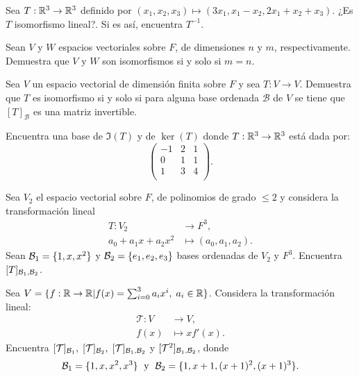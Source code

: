 \documentclass[12pt,a4paper]{book}
\newcommand{\llaves}[1]{\{#1\}}
\begin{document}
    \begin{ejercicio}
        Sea $T: \mathbb{R}^3 \to \mathbb{R}^3$ definido por $(x_1, x_2, x_3) \mapsto (3x_1, x_1 - x_2, 2x_1 + x_2 + x_3)$. ¿Es $T$ isomorfismo lineal?. Si es así, encuentra $T^{-1}$.
    \end{ejercicio}

    \begin{ejercicio}
        Sean $V$ y $W$ espacios vectoriales sobre $F$, de dimensiones $n$ y $m$, respectivamente. Demuestra que $V$ y $W$ son isomorfismos si y solo si $m = n$.
    \end{ejercicio}

    \begin{ejercicio}
        Sea $V$ un espacio vectorial de dimensión finita sobre $F$ y sea $T: V \to V$. Demuestra que $T$ es isomorfismo si y solo si para alguna base ordenada $\mathcal{B}$ de $V$ se tiene que $[T]_\mathcal{B}$ es una matriz invertible.
    \end{ejercicio}

    \begin{ejercicio}
        Encuentra una base de $\Im (T)$ y de $\ker (T)$ donde $T: \mathbb{R}^3 \to \mathbb{R}^3$ está dada por:
        \[
        \begin{pmatrix}
            -1 & 2 & 1\\
            0 & 1 & 1\\
            1 & 3 & 4\\
        \end{pmatrix}.
        \]
    \end{ejercicio}

    \begin{ejercicio}
        Sea $V_2$ el espacio vectorial sobre $F$, de polinomios de grado $\leq 2$ y considera la transformación lineal
        \begin{align*}
            T : V_2 & \to F^3,\\
            a_0 + a_1x + a_2x^2 & \mapsto (a_0, a_1, a_2).
        \end{align*}
        Sean $\BB_1 = \llaves{1, x, x^2}$ y $\BB_2 = \llaves{e_1, e_2, e_3}$ bases ordenadas de $V_2$ y $F^3$. Encuentra $[T]_{\mathcal{B}_1, \mathcal{B}_2}$.
    \end{ejercicio}

    \begin{ejercicio}
        Sea $V = \llaves{f: \R \to \R | f(x) = \sum_{i = 0}^{3}a_ix^{i},\; a_i \in \R}$. Considera la transformación lineal:
        \begin{align*}
            \mathcal{T}: V & \to V,\\
            f(x) & \mapsto xf'(x).
        \end{align*}
        Encuentra $[\mathcal{T}]_{\mathcal{B}_1}, \; [\mathcal{T}]_{\mathcal{B}_2}, \; [\mathcal{T}]_{\mathcal{B}_1, \mathcal{B}_2}$ y $[\mathcal{T}^2]_{\mathcal{B}_1, \mathcal{B}_2}$, donde
        \[
        \BB_1 = \llaves{1, x, x^2, x^3} \; \text{ y } \; \BB_2 = \llaves{1, x + 1, (x + 1)^2, (x + 1)^3}.
        \]
    \end{ejercicio}
\end{document}
